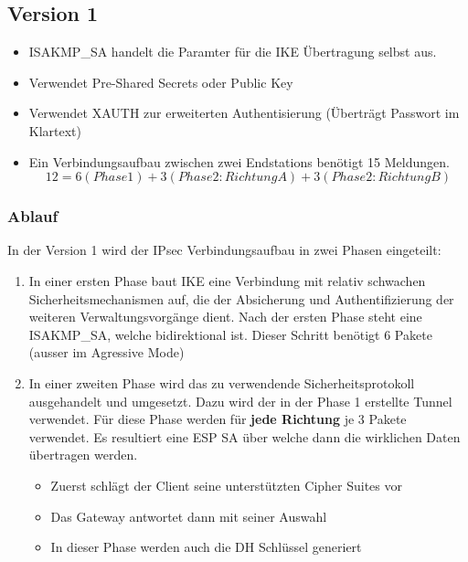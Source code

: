 \subsection{Version 1}
\begin{itemize}
	\item ISAKMP\_SA handelt die Paramter für die IKE Übertragung selbst aus.
	\item Verwendet Pre-Shared Secrets oder Public Key
	\item Verwendet XAUTH zur erweiterten Authentisierung (Überträgt Passwort im Klartext)
	\item Ein Verbindungsaufbau zwischen zwei Endstations benötigt 15 Meldungen.
	\[
	12 = 6 (Phase 1) + 3 (Phase 2: Richtung A) + 3 (Phase 2: Richtung B)
	\]
\end{itemize}

\subsubsection{Ablauf}
In der Version 1 wird der IPsec Verbindungsaufbau in zwei Phasen eingeteilt:
\begin{enumerate}
	\item In einer ersten Phase baut IKE eine Verbindung mit relativ schwachen Sicherheitsmechanismen auf, die der Absicherung und Authentifizierung der weiteren Verwaltungsvorgänge dient. Nach der ersten Phase steht eine ISAKMP\_SA, welche bidirektional ist. Dieser Schritt benötigt 6 Pakete (ausser im Agressive Mode)
	\item In einer zweiten Phase wird das zu verwendende Sicherheitsprotokoll ausgehandelt und umgesetzt. Dazu wird der in der Phase 1 erstellte Tunnel verwendet. Für diese Phase werden für \textbf{jede Richtung} je 3 Pakete verwendet. Es resultiert eine ESP SA über welche dann die wirklichen Daten übertragen werden.
	\begin{itemize}
		\item Zuerst schlägt der Client seine unterstützten Cipher Suites vor
		\item Das Gateway antwortet dann mit seiner Auswahl
		\item In dieser Phase werden auch die DH Schlüssel generiert
	\end{itemize}
\end{enumerate}


